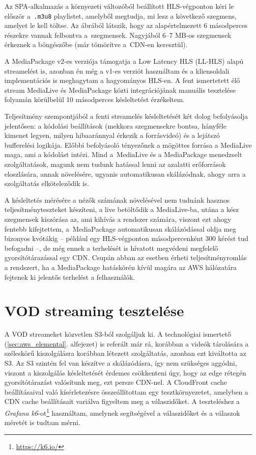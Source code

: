 Az SPA-alkalmazás a környezeti változóból beállított HLS-végponton kéri le először a~\verb|.m3u8| playlistet, amelyből megtudja, mi lesz a következő szegmens, amelyet le kell töltse. Az ábrából látszik, hogy az alapértelmezett 6 másodperces részekre vannak felbontva a~szegmensek. Nagyjából 6--7 MB-os szegmensek érkeznek a böngészőbe (már tömörítve a~CDN-en keresztül).

A MediaPackage v2-es verziója támogatja a Low Latency HLS (LL-HLS) alapú streamelést is, azonban én még a v1-es verziót használtam és a kliensoldali implementációs is meghagytam a hagyományos HLS-en. A fent ismertetett élő stream MediaLive és MediaPackage közti integrációjának manuális tesztelése folyamán körülbelül 10 másodperces késleltetést érzékeltem.

Teljesítmény szempontjából a fenti streamelés késleltetését két dolog befolyásolja jelentősen: a kódolási beállítások (mekkora szegmensekre bontsa, hányféle kimenet legyen, milyen hibaaránnyal érkezik a forrásvideó) és a lejátszó bufferelési logikája. Előbbi befolyásoló tényezőnek a mögöttes forrása a MediaLive maga, ami a kódolást intézi. Mind a~MediaLive és a MediaPackage menedzselt szolgáltatások, magunk nem tudunk hatással lenni az azalatti erőforrások eloszlására, annak növelésére, ugyanis automatikusan skálázódnak, ahogy arra a szolgáltatás elköteleződik is.

A késleltetés mérésére a nézők számának növelésével nem tudnánk hasznos teljesítményteszteket készíteni, a live betöltődik a MediaLive-ba, utána a kész szegmensek kiszórása az, ami kihívás a rendszer számára, viszont ezt ahogy fentebb kifejtettem, a~MediaPackage automatikusan skálázódással oldja meg bizonyos kvótákig -- például egy HLS-végponton másodpercenként 300 kérést tud befogadni\cite{empQuotas} --, de még ennek a terhelését is hívatott megvédeni megfelelő gyorsítótárazással egy CDN. Csupán abban az esetben érheti teljesítményromlás a rendszert, ha a MediaPackage hatáskörén kívül magára az AWS hálózatára fejtenek ki jelentős terhelést a felhasználók.\cite{latency}

\section{VOD streaming tesztelése}\label{sec:vod_test}

A VOD streameket közvetlen S3-ból szolgáljuk ki. A technológiai ismertető (\ref{sec:aws_elemental}. alfejezet) is referált már rá, korábban a videók tárolására a széleskörű kiszolgálásra korábban létezett szolgáltatás, azonban ezt kiváltotta az S3.\cite{Mediastore} Az S3 szintén fel van készítve a skálázódásra\cite{s3perf}, így nem szükséges aggódni, viszont a kiszolgálás késleltetését érdemes csökkenteni úgy, hogy az edge rétegén gyorsítótárazást valósítunk meg, ezt persze CDN-nel. A CloudFront cache beállításaival való kísérletezésre összeállítottam egy tesztkörnyezetet, amelyben a CDN cache beállításait variálva figyeltem meg a válaszidőket. A teszteléshez a \emph{Grafana k6}-ot\footnote{\url{https://k6.io/}} használtam, amelynek segítségével a válaszidőket és a válaszok méretét is tudtam mérni.\cite{loadtests}

